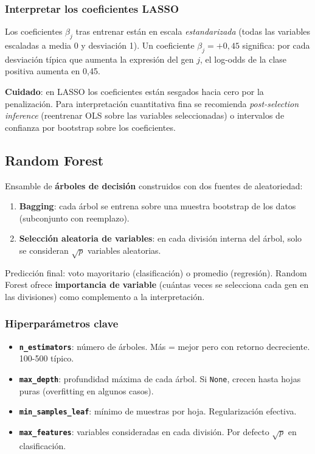 \documentclass[11pt, a4paper]{article}
\begin{document}
\subsubsection*{Interpretar los coeficientes LASSO}

Los coeficientes $\beta_j$ tras entrenar est\'an en escala
\emph{estandarizada} (todas las variables escaladas a media 0 y
desviaci\'on 1). Un coeficiente $\beta_j = +0{,}45$ significa: por cada
desviaci\'on t\'ipica que aumenta la expresi\'on del gen $j$, el
log-odds de la clase positiva aumenta en 0,45.

\textbf{Cuidado}: en LASSO los coeficientes est\'an sesgados hacia cero
por la penalizaci\'on. Para interpretaci\'on cuantitativa fina se
recomienda \emph{post-selection inference} (reentrenar OLS sobre las
variables seleccionadas) o intervalos de confianza por bootstrap sobre
los coeficientes.

\subsection{Random Forest}

Ensamble de \textbf{\'arboles de decisi\'on} construidos con dos fuentes
de aleatoriedad:

\begin{enumerate}[leftmargin=1.4em]
  \item \textbf{Bagging}: cada \'arbol se entrena sobre una muestra
  bootstrap de los datos (subconjunto con reemplazo).
  \item \textbf{Selecci\'on aleatoria de variables}: en cada divisi\'on
  interna del \'arbol, solo se consideran $\sqrt{p}$ variables aleatorias.
\end{enumerate}

Predicci\'on final: voto mayoritario (clasificaci\'on) o promedio
(regresi\'on). Random Forest ofrece \textbf{importancia de variable}
(cu\'antas veces se selecciona cada gen en las divisiones) como
complemento a la interpretaci\'on.

\subsubsection*{Hiperpar\'ametros clave}

\begin{itemize}[leftmargin=1.2em]
  \item \textbf{\texttt{n\_estimators}}: n\'umero de \'arboles.
  M\'as = mejor pero con retorno decreciente. 100-500 t\'ipico.
  \item \textbf{\texttt{max\_depth}}: profundidad m\'axima de cada
  \'arbol. Si \texttt{None}, crecen hasta hojas puras (overfitting en
  algunos casos).
  \item \textbf{\texttt{min\_samples\_leaf}}: m\'inimo de muestras por
  hoja. Regularizaci\'on efectiva.
  \item \textbf{\texttt{max\_features}}: variables consideradas en cada
  divisi\'on. Por defecto $\sqrt{p}$ en clasificaci\'on.
\end{itemize}
\end{document}
